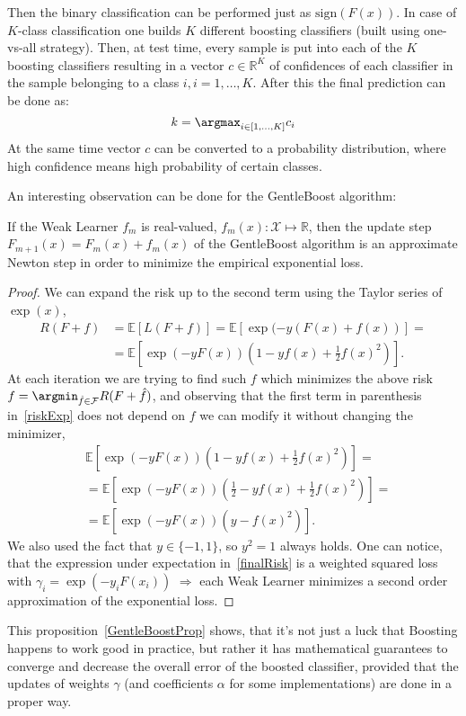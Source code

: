 Then the binary classification can be performed just as $\mathrm{sign}(F(x))$. In case of $K$-class classification one
builds $K$ different boosting classifiers (built using one-vs-all strategy). Then, at test time, every sample is put into each
of the $K$ boosting classifiers resulting in a vector $c \in \mathbb{R}^K$ of confidences of each classifier in the sample
belonging to a class $i, i = 1,\dotsc, K$. After this the final prediction can be done as:
\begin{equation}
 k = \argmax_{i \in [1,\dotsc, K]} c_i
\end{equation}
At the same time vector $c$ can be converted to a probability distribution, where high confidence means high probability of
certain classes.

An interesting observation can be done for the GentleBoost algorithm:
\begin{proposition}
  \label{GentleBoostProp}
 If the Weak Learner $f_m$ is real-valued, $f_m(x) \colon \mathcal{X} \mapsto \mathbb{R}$, then the update step
 $F_{m+1}(x) = F_m(x) + f_m(x)$ of the GentleBoost algorithm is an approximate Newton step in order to minimize
 the empirical exponential loss.
 \begin{proof}
  We can expand the risk up to the second term using the Taylor series of $\exp{(x)}$,
  \begin{align}
   R(F + f) &= \mathbb{E}\left[ L(F + f) \right] = \mathbb{E}\left[ \exp{(-y(F(x) + f(x))} \right] =\nonumber \\ 
   &= \mathbb{E}\left[ \exp{(-y F(x))}(1 - y f(x) + \frac{1}{2}{f(x)}^2) \right]. \label{riskExp}
  \end{align}
  At each iteration we are trying to find such $f$ which minimizes the above risk $ f = \argmin_{\hat{f} \in \mathcal{F}} R(F + \hat{f})$,
  and observing that the first term in parenthesis in~\eqref{riskExp} does not depend on $f$ we can modify it without 
  changing the minimizer,
  \begin{align}
   &\mathbb{E}\left[ \exp{(-y F(x))}(1 - y f(x) + \frac{1}{2}{f(x)}^2) \right] =\nonumber \\
   &= \mathbb{E}\left[ \exp{(-y F(x))}(\frac{1}{2} - y f(x) + \frac{1}{2}{f(x)}^2) \right] =\nonumber \\ 
   &= \mathbb{E}\left[ \exp{(-y F(x))}(y - {f(x)}^2) \right]. \label{finalRisk}
  \end{align}
  We also used the fact that $y \in \{ -1, 1\}$, so $y^2 = 1$ always holds. One can notice, that the expression 
  under expectation in~\eqref{finalRisk} is a weighted squared loss with $\gamma_i = \exp{(-y_i F(x_i))}$ $\Rightarrow$ each
  Weak Learner minimizes a second order approximation of the exponential loss.
 \end{proof}
\end{proposition}
This proposition~\ref{GentleBoostProp} shows, that it's not just a luck that Boosting happens to work good in practice, but rather
it has mathematical guarantees to converge and decrease the overall error of the boosted classifier, provided that the updates
of weights $\gamma$ (and coefficients $\alpha$ for some implementations) are done in a proper way.

